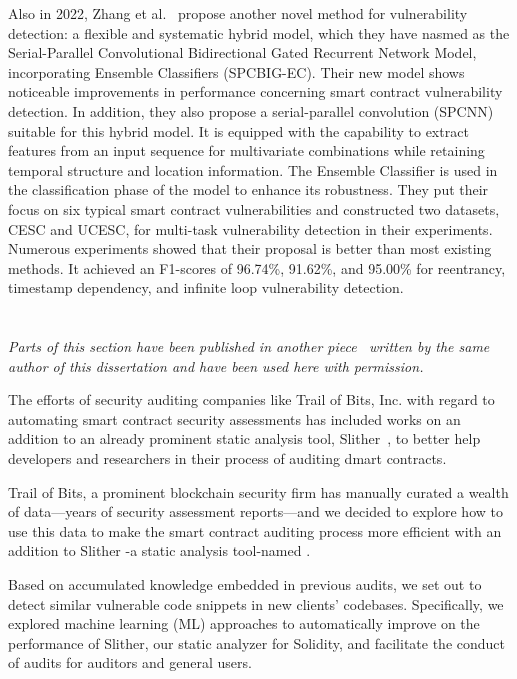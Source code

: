 Also in 2022, Zhang et al.~\cite{zhang2022spcbig} propose another novel method for vulnerability detection:
a flexible and systematic hybrid model, which they have nasmed as the Serial-Parallel Convolutional Bidirectional Gated
Recurrent Network Model, incorporating Ensemble Classifiers (SPCBIG-EC).
Their new model shows noticeable improvements in performance concerning smart contract vulnerability detection.
In addition, they also propose a serial-parallel convolution (SPCNN) suitable for this hybrid model.
It is equipped with the capability to extract features from an input sequence for multivariate combinations while retaining temporal structure and location information.
The Ensemble Classifier is used in the classification phase of the model to enhance its
robustness. They put their focus on six typical smart contract vulnerabilities and constructed two
datasets, CESC and UCESC, for multi-task vulnerability detection in their experiments.
Numerous experiments showed that their proposal is better than most existing methods.
It achieved an F1-scores of 96.74\%, 91.62\%, and 95.00\% for reentrancy, timestamp
dependency, and infinite loop vulnerability detection.

\section{\slithersimil}

\textit{Parts of this section have been published in another piece~\cite{pilehchiha_2020} written by the same author of this dissertation and have been used here with permission.}

The efforts of security auditing companies like Trail of Bits, Inc. with regard to automating smart contract security assessments has included works on an addition to an already prominent static analysis tool, Slither~\cite{slither}, to better help developers and researchers in their process of auditing dmart contracts.

Trail of Bits, a prominent blockchain security firm has manually curated a wealth of data—years of security assessment reports—and we decided to explore how to use this data to make the smart
contract auditing process more efficient with an addition to Slither -a static analysis tool-named \slithersimil.

Based on accumulated knowledge embedded in previous audits, we set out to detect similar vulnerable code snippets in new clients' codebases.
Specifically, we explored machine learning (ML) approaches to automatically improve on the performance of Slither, our static analyzer for Solidity, and facilitate the conduct of audits for auditors and general users.

